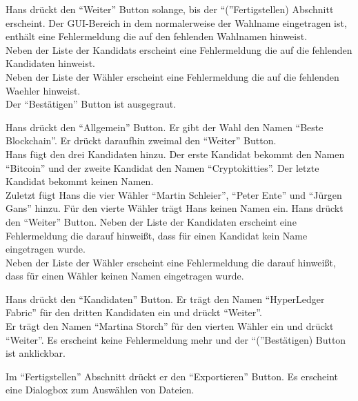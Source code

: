\documentclass[parskip=full,11pt,twoside]{scrartcl}
\begin{document}

		{Hans drückt den \enquote{Weiter} Button solange, bis der \enquote(Fertigstellen) Abschnitt erscheint.}
		{Der GUI-Bereich in dem normalerweise der Wahlname eingetragen ist, enthält eine Fehlermeldung die auf den fehlenden Wahlnamen hinweist.\\
		Neben der Liste der \glspl{Kandidat} erscheint eine Fehlermeldung die auf die fehlenden Kandidaten hinweist.\\
		Neben der Liste der Wähler erscheint eine Fehlermeldung die auf die fehlenden \gls{Waehler} hinweist.\\
		Der \enquote{Bestätigen} Button ist ausgegraut.}

\teststep{}
		{Hans drückt den \enquote{Allgemein} Button. Er gibt der Wahl den Namen \enquote{Beste Blockchain}. Er drückt daraufhin zweimal den \enquote{Weiter} Button.\\
		Hans fügt den drei Kandidaten hinzu. Der erste Kandidat bekommt den Namen \enquote{Bitcoin} und der zweite Kandidat den Namen \enquote{Cryptokitties}. Der letzte Kandidat bekommt keinen Namen.\\
		Zuletzt fügt Hans die vier Wähler \enquote{Martin Schleier}, \enquote{Peter Ente} und \enquote{Jürgen Gans} hinzu. Für den vierte Wähler trägt Hans keinen Namen ein. Hans drückt den \enquote{Weiter} Button.}
		{Neben der Liste der Kandidaten erscheint eine Fehlermeldung die darauf hinweißt, dass für einen Kandidat kein Name eingetragen wurde.\\
		Neben der Liste der Wähler erscheint eine Fehlermeldung die darauf hinweißt, dass für einen Wähler keinen Namen eingetragen wurde.}
	
\teststep{}
		{Hans drückt den \enquote{Kandidaten} Button. Er trägt den Namen \enquote{HyperLedger Fabric} für den dritten Kandidaten ein und drückt \enquote{Weiter}.\\
		Er trägt den Namen \enquote{Martina Storch} für den vierten Wähler ein und drückt \enquote{Weiter}.}
		{Es erscheint keine Fehlermeldung mehr und der \enquote(Bestätigen) Button ist anklickbar.}
		

		{Im \enquote{Fertigstellen} Abschnitt drückt er den \enquote{Exportieren} Button.}
		{Es erscheint eine Dialogbox zum Auswählen von Dateien.}
\end{document}
